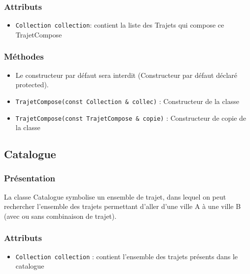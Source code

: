 \documentclass[10pt,a4paper,twoside]{article}
\begin{document}
\subsubsection{Attributs}
\begin{itemize}
\item \verb=Collection collection=: contient la liste des Trajets qui compose ce TrajetCompose
\end{itemize}
\subsubsection{Méthodes}
\begin{itemize}
\item Le constructeur par défaut sera interdit (Constructeur par défaut déclaré protected).
\item \verb$TrajetCompose(const Collection & collec)$ : Constructeur de la classe
\item \verb=TrajetCompose(const TrajetCompose & copie)= : Constructeur de copie de la classe
\end{itemize}

\subsection{Catalogue}
\subsubsection{Présentation}
La classe Catalogue symbolise un ensemble de trajet, dans lequel on peut rechercher l'ensemble des trajets permettant d'aller d'une ville A à une ville B (avec ou sans combinaison de trajet).
\subsubsection{Attributs}
\begin{itemize}
\item \verb=Collection collection= : contient l'ensemble des trajets présents dans le catalogue
\end{itemize}
\end{document}
